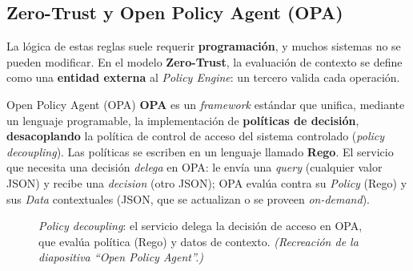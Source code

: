 \documentclass[11pt,a4paper]{article}
\begin{document}
\subsection{Zero-Trust y Open Policy Agent (OPA)}
La lógica de estas reglas suele requerir \textbf{programación}, y muchos sistemas no se pueden
modificar. En el modelo \textbf{Zero-Trust}, la evaluación de contexto se define como una
\textbf{entidad externa} al \emph{Policy Engine}: un tercero valida cada operación.

\begin{defbox}{Open Policy Agent (OPA)}
\textbf{OPA} es un \emph{framework} estándar que unifica, mediante un lenguaje programable, la
implementación de \textbf{políticas de decisión}, \textbf{desacoplando} la política de control
de acceso del sistema controlado (\emph{policy decoupling}). Las políticas se escriben en un
lenguaje llamado \textbf{Rego}. El servicio que necesita una decisión \emph{delega} en OPA:
le envía una \emph{query} (cualquier valor JSON) y recibe una \emph{decision} (otro JSON); OPA
evalúa contra su \emph{Policy} (Rego) y sus \emph{Data} contextuales (JSON, que se actualizan
o se proveen \emph{on-demand}).
\end{defbox}

\begin{figure}[h]
\centering
{}
\caption{\emph{Policy decoupling}: el servicio delega la decisión de acceso en OPA, que evalúa
política (Rego) y datos de contexto. \textit{(Recreación de la diapositiva ``Open Policy
Agent''.)}}
\end{figure}
\end{document}
